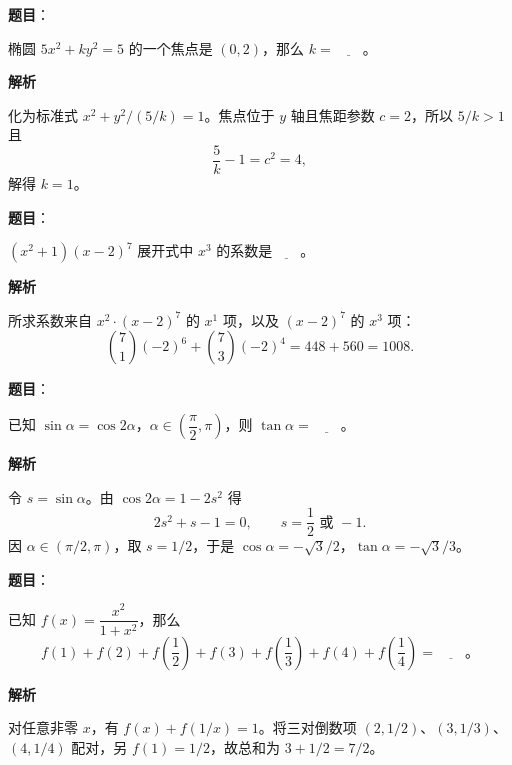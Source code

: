 \begin{answer}

\textbf{题目}：

椭圆 $5x^2+ky^2=5$ 的一个焦点是 $(0,2)$，那么 $k=\underline{\qquad}$。

\textbf{解析}

化为标准式 $x^2+y^2/(5/k)=1$。焦点位于 $y$ 轴且焦距参数 $c=2$，所以 $5/k>1$ 且
\nopagebreak[4]
\[
\frac5k-1=c^2=4,
\]
解得 $k=1$。


\end{answer}
\begin{answer}

\textbf{题目}：

$(x^2+1)(x-2)^7$ 展开式中 $x^3$ 的系数是$\underline{\qquad}$。

\textbf{解析}

所求系数来自 $x^2\cdot(x-2)^7$ 的 $x^1$ 项，以及 $(x-2)^7$ 的 $x^3$ 项：
\nopagebreak[4]
\[
\binom71(-2)^6+\binom73(-2)^4=448+560=1008.
\]


\end{answer}
\begin{answer}

\textbf{题目}：

已知 $\sin\alpha=\cos2\alpha$，$\alpha\in\left(\dfrac\pi2,\pi\right)$，则 $\tan\alpha=\underline{\qquad}$。

\textbf{解析}

令 $s=\sin\alpha$。由 $\cos2\alpha=1-2s^2$ 得
\nopagebreak[4]
\[
2s^2+s-1=0,\qquad s=\frac12\text{ 或 }-1.
\]
因 $\alpha\in(\pi/2,\pi)$，取 $s=1/2$，于是 $\cos\alpha=-\sqrt3/2$，$\tan\alpha=-\sqrt3/3$。


\end{answer}
\begin{answer}

\textbf{题目}：

已知 $f(x)=\dfrac{x^2}{1+x^2}$，那么
\nopagebreak[4]
\[f(1)+f(2)+f\left(\frac12\right)+f(3)+f\left(\frac13\right)+f(4)+f\left(\frac14\right)=\underline{\qquad}\text{。}\]

\textbf{解析}

对任意非零 $x$，有 $f(x)+f(1/x)=1$。将三对倒数项 $(2,1/2)$、$(3,1/3)$、$(4,1/4)$ 配对，另 $f(1)=1/2$，故总和为 $3+1/2=7/2$。


\end{answer}

